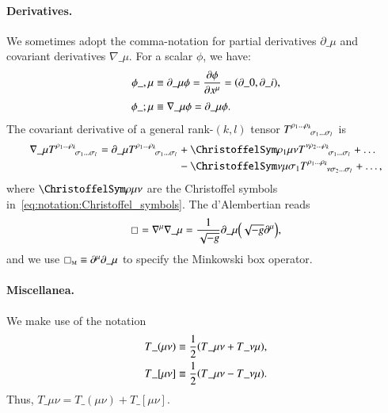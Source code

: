 \paragraph{Derivatives.} 
We sometimes adopt the comma-notation for partial derivatives $\partial\_\mu$ and covariant derivatives $\nabla\_\mu$. For a scalar $\phi$, we have:
\begin{subequations}\label{eq:notation:comma_notation_darivatives}
    \begin{align}
        \phi\_{,\mu} &\equiv \partial\_\mu \phi = \pdv{\phi}{x\^\mu} =\pclosed{\partial\_0, \partial\_i }, \\
        \phi\_{;\mu} &\equiv \nabla\_\mu \phi = \partial\_\mu \phi . 
    \end{align}
\end{subequations}
The covariant derivative of a general rank-$(k,l)$ tensor $T\iud{\rho_1 \dots \rho_k}{\sigma_1 \dots \sigma_l}$ is
\begin{equation}\label{eq:notation:covariant_derivative_rank_kl}
    \begin{split}
        \nabla\_\mu T\iud{\rho_1 \dots \rho_k}{\sigma_1 \dots \sigma_l} = \partial\_\mu T\iud{\rho_1 \dots \rho_k}{\sigma_1 \dots \sigma_l} &+ \Chr{\rho_1}{\mu\nu} T\iud{\nu \rho_2 \dots \rho_k}{\sigma_1 \dots \sigma_l} + \dots \\
        &- \Chr{\nu}{\mu\sigma_1} T\iud{\rho_1 \dots \rho_k}{\nu\sigma_2 \dots \sigma_l} + \dots,
    \end{split}
\end{equation}
where $\Chr{\rho}{\mu\nu}$ are the Christoffel symbols in~\cref{eq:notation:Christoffel_symbols}.
The d'Alembertian reads
\begin{equation}\label{eq:notation:dAlembertian}
    \sq   = \nabla\^\mu \nabla\_\mu  = \frac{1}{\sqrt{-g}} \partial\_\mu \pclosed{ \sqrt{-g} \partial\^\mu},
\end{equation}
and we use $\sq\nped{M} \equiv \partial\^\mu\partial\_\mu$ to specify the Minkowski box operator.


\paragraph{Miscellanea.} %
We make use of the notation
\begin{subequations}\label{eq:notation:sym_and_antisym_tensor_notation}
    \begin{align}
        T\_{(\mu\nu)} &\equiv \frac{1}{2} {\left(  T\_{\mu\nu} + T\_{\nu\mu}   \right)}, \\
        T\_{[\mu\nu]} &\equiv \frac{1}{2} {\left(  T\_{\mu\nu} - T\_{\nu\mu}   \right)}.
    \end{align} 
\end{subequations}
Thus, $T\_{\mu\nu}= T\_{(\mu\nu)} + T\_{[\mu\nu]}$. %



